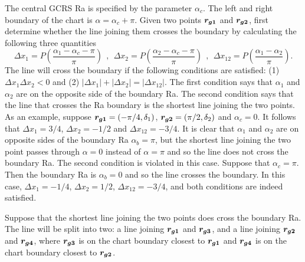 \documentclass[12pt]{article}
\newcommand \beq {\begin{equation}}
\newcommand \eeq {\end{equation}}
\newcommand{\ve}[1]{\mbox{\boldmath $#1$}}
\begin{document}
The central GCRS Ra is specified by the parameter $\alpha_c$. The left and 
right boundary of the chart is $\alpha=\alpha_c +\pi$. Given two points 
$\ve{r_{g1}}$ and $\ve{r_{g2}}$, first determine whether the line 
joining them crosses the boundary by calculating the following three quantities
\beq
  \Delta x_1 = P \left(\frac{\alpha_1-\alpha_c-\pi}{\pi}\right) \ \ , \ \ 
  \Delta x_2 = P\left(\frac{\alpha_2-\alpha_c-\pi}{\pi}\right) \ \ , \ \
  \Delta x_{12} = P\left(\frac{\alpha_1-\alpha_2}{\pi}\right) .
\eeq
The line will cross the 
boundary if the following conditions are satisfied: (1) $\Delta x_1 \Delta x_2 <0$ 
and (2) $|\Delta x_1| + |\Delta x_2| = |\Delta x_{12}|$. The first 
condition says that $\alpha_1$ and $\alpha_2$ are on the opposite side of the 
boundary Ra. The second condition says that the line that crosses the Ra boundary is 
the shortest line joining the two points. As an example, suppose 
$\ve{r_{g1}}=(-\pi/4,\delta_1)$, $\ve{r_{g2}}=(\pi/2,\delta_2)$ and 
$\alpha_c=0$. It follows that $\Delta x_1 = 3/4$, $\Delta x_2=-1/2$ and 
$\Delta x_{12}=-3/4$. It is clear that $\alpha_1$ and $\alpha_2$ are on 
opposite sides of the boundary Ra $\alpha_b=\pi$, but the shortest line 
joining the two point passes through $\alpha=0$ instead of $\alpha=\pi$ 
and so the line does not cross the boundary Ra. The second condition is 
violated in this case. Suppose that $\alpha_c=\pi$. Then the boundary Ra 
is $\alpha_b=0$ and so the line crosses the boundary. In this case, 
$\Delta x_1=-1/4$, $\Delta x_2=1/2$, $\Delta x_{12}=-3/4$, and both 
conditions are indeed satisfied.

Suppose that the shortest line joining the two points does cross the 
boundary Ra. The line will be split into two: a line joining 
$\ve{r_{g1}}$ and $\ve{r_{g3}}$, and a line joining $\ve{r_{g2}}$ and 
$\ve{r_{g4}}$, where $\ve{r_{g3}}$ is on the chart boundary closest 
to $\ve{r_{g1}}$ and $\ve{r_{g4}}$ is on the chart boundary closest to 
$\ve{r_{g2}}$.
\end{document}
